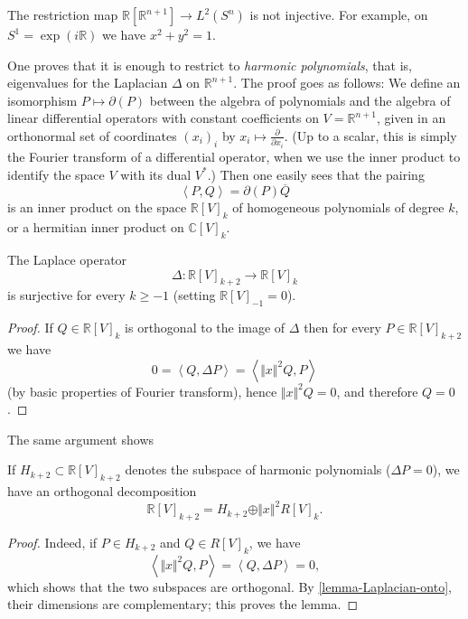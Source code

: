 The restriction map $\mathbb R[\mathbb R^{n+1}] \to L^2(S^n)$ is not injective. For example, on $S^1 = \exp(i\mathbb R)$ we have $x^2 + y^2 = 1$. 

One proves that it is enough to restrict to \emph{harmonic polynomials}, that is, eigenvalues for the Laplacian $\Delta$ on $\mathbb R^{n+1}$. The proof goes as follows: We define an isomorphism $P\mapsto \partial (P)$ between the algebra of polynomials and the algebra of linear differential operators with constant coefficients on $V = \mathbb R^{n+1}$, given in an orthonormal set of coordinates $(x_i)_i$ by $x_i\mapsto \frac{\partial}{\partial x_i}$. (Up to a scalar, this is simply the Fourier transform of a differential operator, when we use the inner product to identify the space $V$ with its dual $V^*$.) Then one easily sees that the pairing 
\begin{equation}
 \label{equation-pairing-homogeneous}
 \left< P , Q\right> = \partial(P) \overline{Q}
\end{equation}
is an inner product on the space $\mathbb R[V]_k$ of homogeneous polynomials of degree $k$, or a hermitian inner product on $\mathbb C[V]_k$.


\begin{lemma}
 \label{lemma-Laplacian-onto}
The Laplace operator
$$ \Delta:\mathbb R[V]_{k+2}  \to \mathbb R[V]_k$$
is surjective for every $k\ge -1$ (setting $\mathbb R[V]_{-1} =0$).  
\end{lemma}

\begin{proof}
 If $Q\in \mathbb R[V]_k$ is orthogonal to the image of $\Delta$ then for every $P\in \mathbb R[V]_{k+2}$ we have
 $$ 0 = \left < Q, \Delta P \right> = \left< \Vert x\Vert^2 Q, P\right>$$
 (by basic properties of Fourier transform),
 hence $\Vert x \Vert^2 Q = 0$, and therefore $Q=0$.
\end{proof} 
 
The same argument shows
\begin{lemma}
 \label{lemma-harmonic-rest}
If $H_{k+2} \subset \mathbb R[V]_{k+2}$ denotes the subspace of harmonic polynomials ($\Delta P=0$), we have an orthogonal decomposition
$$\mathbb R[V]_{k+2} = H_{k+2} \oplus \Vert x\Vert^2 R[V]_k.$$
\end{lemma}

\begin{proof}
 Indeed, if $P \in H_{k+2}$ and $Q\in R[V]_k$, we have 
 $$\left< \Vert x\Vert^2 Q, P\right> =\left < Q, \Delta P \right> =0,$$ 
 which shows that the two subspaces are orthogonal. By \ref{lemma-Laplacian-onto}, their dimensions are complementary; this proves the lemma.
\end{proof}


